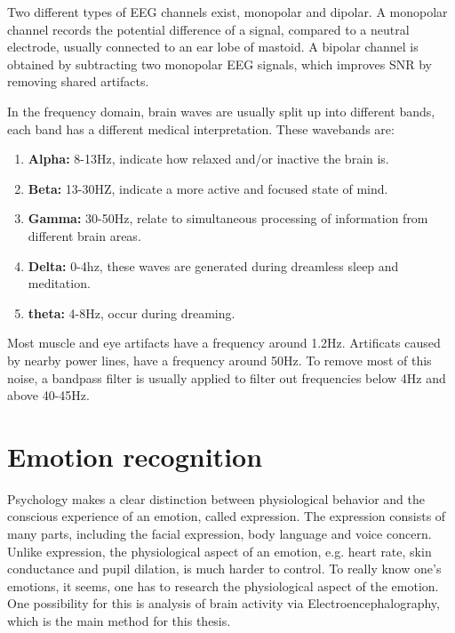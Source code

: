 
Two different types of EEG channels exist, monopolar and dipolar. A monopolar channel records the potential difference of a signal, compared to a neutral electrode, usually connected to an ear lobe of mastoid. A bipolar channel is obtained by subtracting two monopolar EEG signals, which improves SNR by removing shared artifacts\cite{MonoBiPolar}. 

In the frequency domain, brain waves are usually split up into different bands\cite{EmotionRelativePower,WavesSite}, each band has a different medical interpretation. These wavebands \label{wavebands} are:
\begin{enumerate}
\item \textbf{Alpha:} 8-13Hz, indicate how relaxed and/or inactive the brain is.
\item \textbf{Beta:} 13-30HZ, indicate a more active and focused state of mind.
\item \textbf{Gamma:} 30-50Hz, relate to simultaneous processing of information from different brain areas.
\item \textbf{Delta:} 0-4hz, these waves are generated during dreamless sleep and meditation.
\item \textbf{theta:} 4-8Hz, occur during dreaming.
\end{enumerate}
Most muscle and eye artifacts have a frequency around 1.2Hz. Artificats caused by nearby power lines, have a frequency around 50Hz\cite{ExtendedPaper}. To remove most of this noise, a bandpass filter is usually applied to filter out frequencies below 4Hz and above 40-45Hz.



\section{Emotion recognition}

Psychology makes a clear distinction between physiological behavior and the conscious experience of an emotion, called expression\cite{ExtendedPaper}. The expression consists of many parts, including the facial expression, body language and voice concern. Unlike expression, the physiological aspect of an emotion, e.g. heart rate, skin conductance and pupil dilation, is much harder to control. To really know one's emotions, it seems, one has to research the physiological aspect of the emotion. One possibility for this is analysis of brain activity via Electroencephalography\cite{EEGDatasets}, which is the main method for this thesis.


